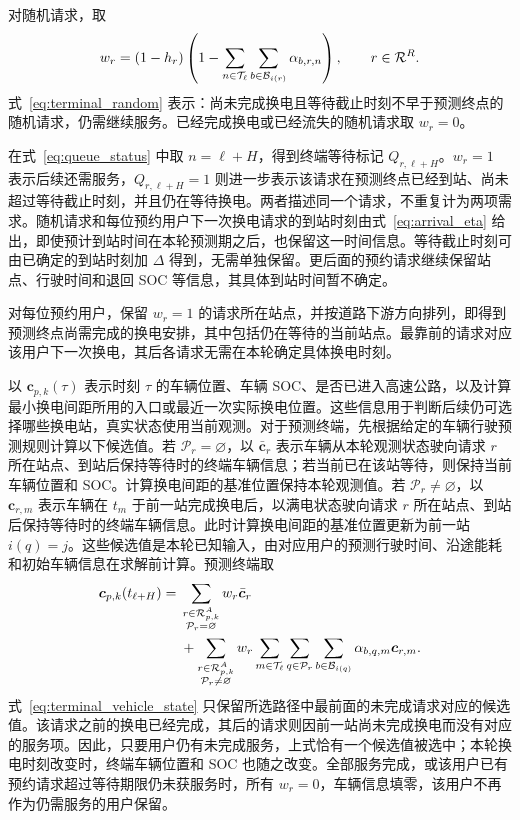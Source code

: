对随机请求，取
\begin{equation}
w_r=(1-h_r)\left(
1-\sum_{n\in\mathcal T_\ell}
\sum_{b\in\mathcal B_{i(r)}}\alpha_{b,r,n}
\right),\qquad r\in\mathcal R^R.
\label{eq:terminal_random}
\end{equation}
式~\eqref{eq:terminal_random} 表示：尚未完成换电且等待截止时刻不早于预测终点的随机请求，仍需继续服务。已经完成换电或已经流失的随机请求取 $w_r=0$。

在式~\eqref{eq:queue_status} 中取 $n=\ell+H$，得到终端等待标记 $Q_{r,\ell+H}$。$w_r=1$ 表示后续还需服务，$Q_{r,\ell+H}=1$ 则进一步表示该请求在预测终点已经到站、尚未超过等待截止时刻，并且仍在等待换电。两者描述同一个请求，不重复计为两项需求。随机请求和每位预约用户下一次换电请求的到站时刻由式~\eqref{eq:arrival_eta} 给出，即使预计到站时间在本轮预测期之后，也保留这一时间信息。等待截止时刻可由已确定的到站时刻加 $\Delta$ 得到，无需单独保留。更后面的预约请求继续保留站点、行驶时间和退回 SOC 等信息，其具体到站时间暂不确定。

对每位预约用户，保留 $w_r=1$ 的请求所在站点，并按道路下游方向排列，即得到预测终点尚需完成的换电安排，其中包括仍在等待的当前站点。最靠前的请求对应该用户下一次换电，其后各请求无需在本轮确定具体换电时刻。

以 $\boldsymbol c_{p,k}(\tau)$ 表示时刻 $\tau$ 的车辆位置、车辆 SOC、是否已进入高速公路，以及计算最小换电间距所用的入口或最近一次实际换电位置。这些信息用于判断后续仍可选择哪些换电站，真实状态使用当前观测。对于预测终端，先根据给定的车辆行驶预测规则计算以下候选值。若 $\mathcal P_r=\varnothing$，以 $\bar{\boldsymbol c}_r$ 表示车辆从本轮观测状态驶向请求 $r$ 所在站点、到站后保持等待时的终端车辆信息；若当前已在该站等待，则保持当前车辆位置和 SOC。计算换电间距的基准位置保持本轮观测值。若 $\mathcal P_r\ne\varnothing$，以 $\boldsymbol c_{r,m}$ 表示车辆在 $t_m$ 于前一站完成换电后，以满电状态驶向请求 $r$ 所在站点、到站后保持等待时的终端车辆信息。此时计算换电间距的基准位置更新为前一站 $i(q)=j$。这些候选值是本轮已知输入，由对应用户的预测行驶时间、沿途能耗和初始车辆信息在求解前计算。预测终端取
\begin{equation}
\begin{aligned}
\boldsymbol c_{p,k}(t_{\ell+H})={}&
\sum_{\substack{r\in\mathcal R_{p,k}^A\\\mathcal P_r=\varnothing}}
w_r\bar{\boldsymbol c}_r\\
&+\sum_{\substack{r\in\mathcal R_{p,k}^A\\\mathcal P_r\ne\varnothing}}
w_r\sum_{m\in\mathcal T_\ell}\sum_{q\in\mathcal P_r}
\sum_{b\in\mathcal B_{i(q)}}\alpha_{b,q,m}\boldsymbol c_{r,m}.
\end{aligned}
\label{eq:terminal_vehicle_state}
\end{equation}
式~\eqref{eq:terminal_vehicle_state} 只保留所选路径中最前面的未完成请求对应的候选值。该请求之前的换电已经完成，其后的请求则因前一站尚未完成换电而没有对应的服务项。因此，只要用户仍有未完成服务，上式恰有一个候选值被选中；本轮换电时刻改变时，终端车辆位置和 SOC 也随之改变。全部服务完成，或该用户已有预约请求超过等待期限仍未获服务时，所有 $w_r=0$，车辆信息填零，该用户不再作为仍需服务的用户保留。

